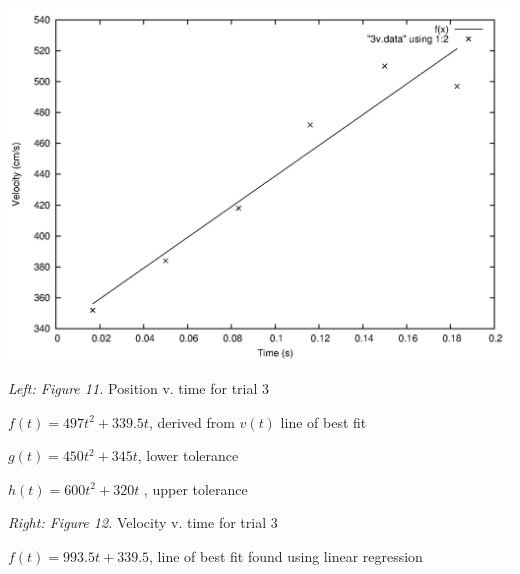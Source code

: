 \documentclass[12pt,letterpaper]{article}
\begin{document}
\includegraphics[scale=0.6]{3v.png}

\textit{Left: Figure 11.} Position v. time for trial 3 

\(f(t) = 497t^2 + 339.5t\), derived from \(v(t)\) line of best fit

\(g(t) = 450t^2 + 345t\), lower tolerance

\(h(t) = 600t^2 + 320t\) , upper tolerance

\textit{Right: Figure 12.} Velocity v. time for trial 3

\(f(t) = 993.5t + 339.5\), line of best fit found using linear regression
\newpage
\end{document}
